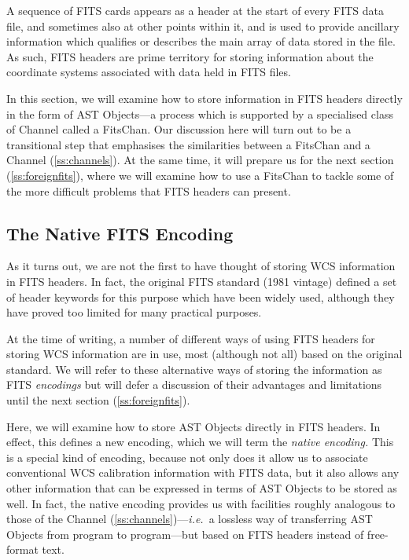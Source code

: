 \documentclass[twoside,11pt]{article}
\newcommand{\htmlref}[2]{#1}
\newcommand{\secref}[1]{\S\ref{#1}}
\renewcommand{\secref}[1]{\ref{#1}}
\begin{document}
A sequence of FITS cards appears as a header at the start of every
FITS data file, and sometimes also at other points within it, and is
used to provide ancillary information which qualifies or describes the
main array of data stored in the file. As such, FITS headers are prime
territory for storing information about the coordinate systems
associated with data held in FITS files.

In this section, we will examine how to store information in FITS
headers directly in the form of AST Objects---a process which is
supported by a specialised class of \htmlref{Channel}{Channel} called a \htmlref{FitsChan}{FitsChan}. Our
discussion here will turn out to be a transitional step that
emphasises the similarities between a FitsChan and a Channel
(\secref{ss:channels}). At the same time, it will prepare us for the
next section (\secref{ss:foreignfits}), where we will examine how to
use a FitsChan to tackle some of the more difficult problems that FITS
headers can present.

\subsection{\label{ss:nativeencoding}The Native FITS Encoding}

As it turns out, we are not the first to have thought of storing WCS
information in FITS headers. In fact, the original FITS standard (1981
vintage) defined a set of header keywords for this purpose which have
been widely used, although they have proved too limited for many
practical purposes.

At the time of writing, a number of different ways of using FITS
headers for storing WCS information are in use, most (although not
all) based on the original standard. We will refer to these
alternative ways of storing the information as FITS {\em{encodings}}
but will defer a discussion of their advantages and limitations until
the next section (\secref{ss:foreignfits}).

Here, we will examine how to store AST Objects directly in FITS
headers. In effect, this defines a new encoding, which we will term
the {\em{native encoding.}} This is a special kind of encoding,
because not only does it allow us to associate conventional
WCS calibration information with FITS data, but it also allows any other
information that can be expressed in terms of AST Objects to be stored
as well.  In fact, the native encoding provides us with facilities
roughly analogous to those of the \htmlref{Channel}{Channel}
(\secref{ss:channels})---{\em{i.e.}}\ a lossless way of
transferring AST Objects from program to program---but based on FITS
headers instead of free-format text.
\end{document}
